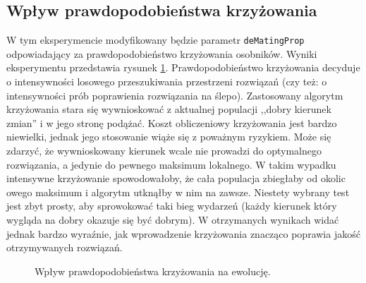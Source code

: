 \documentclass[a4paper,12pt,leqno]{article}
\begin{document}
\subsection{Wpływ prawdopodobieństwa krzyżowania}
W tym eksperymencie modyfikowany będzie parametr \texttt{deMatingProp} odpowiadający za prawdopodobieństwo krzyżowania osobników. Wyniki eksperymentu
przedstawia rysunek \ref{deprop}. Prawdopodobieństwo krzyżowania decyduje o intensywności losowego przeszukiwania przestrzeni rozwiązań (czy też:
o intensywności prób poprawienia rozwiązania na ślepo). Zastosowany algorytm krzyżowania stara się wywnioskować z aktualnej populacji ,,dobry
kierunek zmian'' i w jego stronę podążać. Koszt obliczeniowy krzyżowania jest bardzo niewielki, jednak jego stosowanie wiąże się z poważnym
ryzykiem. Może się zdarzyć, że wywnioskowany kierunek wcale nie prowadzi do optymalnego rozwiązania, a jedynie do pewnego maksimum lokalnego.
W takim wypadku intensywne krzyżowanie spowodowałoby, że cała populacja zbiegłaby od okolic owego maksimum i algorytm utknąłby w nim na zawsze.
Niestety wybrany test jest zbyt prosty, aby sprowokować taki bieg wydarzeń (każdy kierunek który wygląda na dobry okazuje się być dobrym).
W otrzymanych wynikach widać jednak bardzo wyraźnie, jak wprowadzenie krzyżowania znacząco poprawia jakość otrzymywanych rozwiązań.

\begin{figure}\centering
\footnotesize\vspace{-2em}
\normalsize\caption{Wpływ prawdopodobieństwa krzyżowania na ewolucję.}\label{deprop}
\end{figure}
\end{document}
